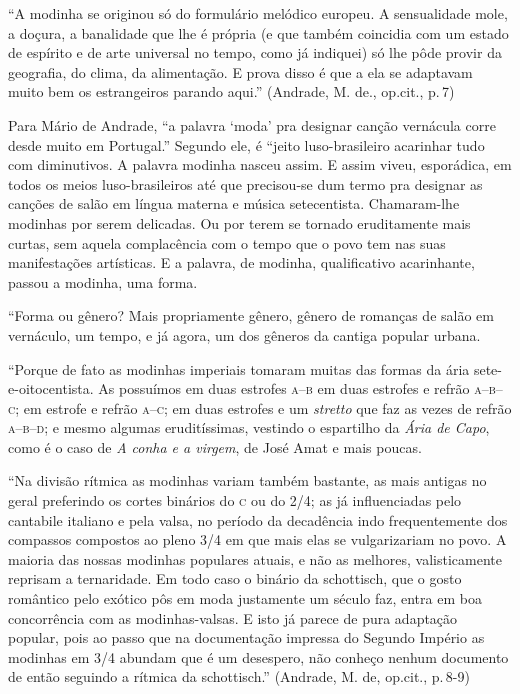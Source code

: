 ``A modinha se originou só do formulário melódico europeu. A sensualidade
mole, a doçura, a banalidade que lhe é própria (e que também coincidia
com um estado de espírito e de arte universal no tempo, como já
indiquei) só lhe pôde provir da geografia, do clima, da alimentação. E
prova disso é que a ela se adaptavam muito bem os estrangeiros parando
aqui.'' (Andrade, M. de., op.cit., p.\,7)

Para Mário de Andrade, ``a palavra `moda' pra designar canção vernácula
corre desde muito em Portugal.'' Segundo ele, é ``jeito luso-brasileiro
acarinhar tudo com diminutivos. A palavra modinha nasceu assim. E assim
viveu, esporádica, em todos os meios luso-brasileiros até que
precisou-se dum termo pra designar as canções de salão em língua materna
e música setecentista. Chamaram-lhe modinhas por serem delicadas. Ou por
terem se tornado eruditamente mais curtas, sem aquela complacência com o
tempo que o povo tem nas suas manifestações artísticas. E a palavra, de
modinha, qualificativo acarinhante, passou a modinha, uma forma.

``Forma ou gênero? Mais propriamente gênero, gênero de romanças de salão
em vernáculo, um tempo, e já agora, um dos gêneros da cantiga popular
urbana.

``Porque de fato as modinhas imperiais tomaram muitas das formas da ária
sete-e-oitocentista. As possuímos em duas estrofes \textsc{a}--\textsc{b} em duas
estrofes e refrão \textsc{a}--\textsc{b}--\textsc{c}; em estrofe e refrão \textsc{a}--\textsc{c}; em duas estrofes
e um \textit{stretto} que faz as vezes de refrão \textsc{a}--\textsc{b}--\textsc{d}; e mesmo algumas
eruditíssimas, vestindo o espartilho da \emph{Ária de Capo}, como é o
caso de \emph{A conha e a virgem}, de José Amat e mais poucas.

``Na divisão rítmica as modinhas variam também bastante, as mais antigas
no geral preferindo os cortes binários do \textsc{c} ou do 2/4; as já
influenciadas pelo cantabile italiano e pela valsa, no período da
decadência indo frequentemente dos compassos compostos ao pleno 3/4 em
que mais elas se vulgarizariam no povo. A maioria das nossas modinhas
populares atuais, e não as melhores, valisticamente reprisam a
ternaridade. Em todo caso o binário da schottisch, que o gosto romântico
pelo exótico pôs em moda justamente um século faz, entra em boa
concorrência com as modinhas-valsas. E isto já parece de pura adaptação
popular, pois ao passo que na documentação impressa do Segundo Império
as modinhas em 3/4 abundam que é um desespero, não conheço nenhum
documento de então seguindo a rítmica da schottisch.'' (Andrade, M. de,
op.cit., p.\,8-9)

